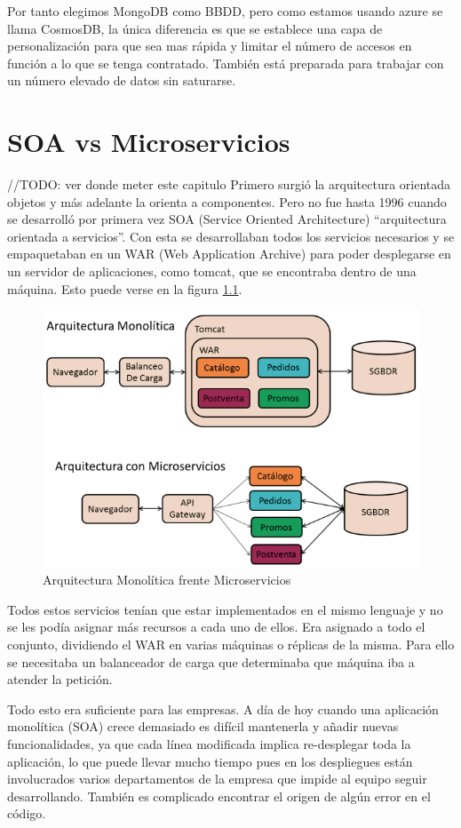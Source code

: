 \documentclass[12pt]{report} %
\begin{document}
Por tanto elegimos MongoDB como BBDD, pero como estamos usando azure se llama CosmosDB, la única diferencia es que se establece una capa de personalización para que sea mas rápida y limitar el número de accesos en función a lo que se tenga contratado. También está preparada para trabajar con un número elevado de datos sin saturarse.

\chapter{SOA vs Microservicios}
//TODO: ver donde meter este capitulo
Primero surgió la arquitectura orientada objetos y más adelante la orienta a componentes. Pero no fue hasta 1996 cuando se desarrolló por primera vez SOA (Service Oriented Architecture) “arquitectura orientada a servicios”. Con esta se desarrollaban todos los servicios necesarios y se empaquetaban en un WAR (Web Application Archive) para poder desplegarse en un servidor de aplicaciones, como tomcat, que se encontraba dentro de una máquina. Esto puede verse en la figura \ref{fig:soavsmicroservicios}.

\begin{figure}
	\centering
	\includegraphics[width=0.7\linewidth]{imagenes/soavsmicroservicios}
	\caption{Arquitectura Monolítica frente Microservicios}
	\label{fig:soavsmicroservicios}
\end{figure}

Todos estos servicios tenían que estar implementados en el mismo lenguaje y no se les podía asignar más recursos a cada uno de ellos. Era asignado a todo el conjunto, dividiendo el WAR en varias máquinas o réplicas de la misma. Para ello se necesitaba un balanceador de carga que determinaba que máquina iba a atender la petición.


Todo esto era suficiente para las empresas. A día de hoy cuando una aplicación monolítica (SOA) crece demasiado es difícil mantenerla y añadir nuevas funcionalidades, ya que cada línea modificada implica re-desplegar toda la aplicación, lo que puede llevar mucho tiempo pues en los despliegues están involucrados varios departamentos de la empresa que impide al equipo seguir desarrollando. También es complicado encontrar el origen de algún error en el código.
\end{document}
